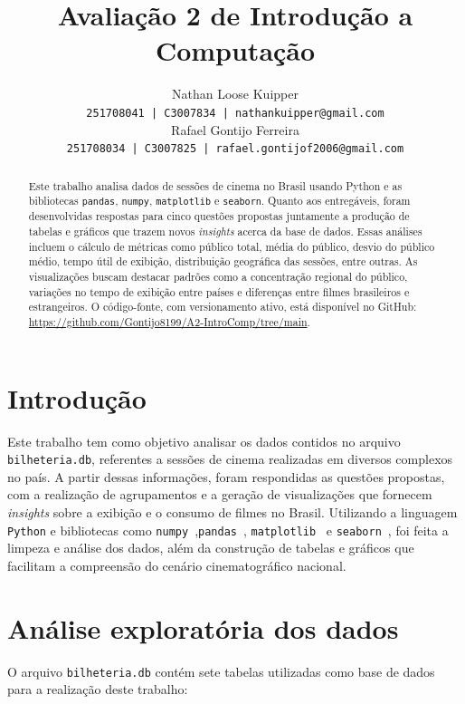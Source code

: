 \documentclass{article}
\title{Avaliação 2 de Introdução a Computação}
\author{Nathan Loose Kuipper \\ \small{\texttt{251708041 | C3007834 | nathankuipper@gmail.com}} \\ Rafael Gontijo Ferreira \\ \small{\texttt{251708034 | C3007825 | rafael.gontijof2006@gmail.com}} }
\begin{document}
\maketitle

\begin{abstract}
Este trabalho analisa dados de sessões de cinema no Brasil usando Python e as bibliotecas \texttt{pandas}, \texttt{numpy}, \texttt{matplotlib} e \texttt{seaborn}. Quanto aos entregáveis, foram desenvolvidas respostas para cinco questões propostas juntamente a produção de tabelas e gráficos que trazem novos \textit{insights} acerca da base de dados. Essas análises incluem o cálculo de métricas como público total, média do público, desvio do público médio, tempo útil de exibição, distribuição geográfica das sessões, entre outras. As visualizações buscam destacar padrões como a concentração regional do público, variações no tempo de exibição entre países e diferenças entre filmes brasileiros e estrangeiros. O código-fonte, com versionamento ativo, está disponível no GitHub: \url{https://github.com/Gontijo8199/A2-IntroComp/tree/main}.
\end{abstract}
\pagebreak
\section{Introdução}
Este trabalho tem como objetivo analisar os dados contidos no arquivo \texttt{bilheteria.db}, referentes a sessões de cinema realizadas em diversos complexos no país. A partir dessas informações, foram respondidas as questões propostas, com a realização de agrupamentos e a geração de visualizações que fornecem \textit{insights} sobre a exibição e o consumo de filmes no Brasil. Utilizando a linguagem \texttt{Python} e bibliotecas como \texttt{numpy}~\cite{numpy_docs},\texttt{pandas}~\cite{pandas_docs}, \texttt{matplotlib}~\cite{matplotlib_docs} e \texttt{seaborn}~\cite{seaborn_docs}, foi feita a limpeza e análise dos dados, além da construção de tabelas e gráficos que facilitam a compreensão do cenário cinematográfico nacional.

\section{Análise exploratória dos dados}

O arquivo \texttt{bilheteria.db} contém sete tabelas utilizadas como base de dados para a realização deste trabalho:
\end{document}
